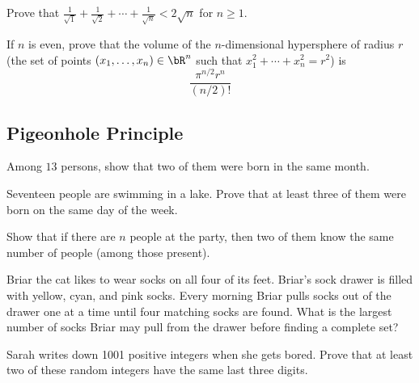 \documentclass[12pt]{article}
\begin{document}
        \begin{exercise}
            Prove that $\frac{1}{\sqrt{1}}+\frac{1}{\sqrt{2}}+\cdots+\frac{1}{\sqrt{n}}<2\sqrt{n}$ for $n\geq 1$.
        \end{exercise}

        \begin{exercise}
            If $n$ is even, prove that the volume of the $n$-dimensional hypersphere of radius $r$ (the set of points $(x_1,\dots,x_n)\in \bR^n$ such that $x_1^2+\cdots+x_n^2 = r^2$) is
            \[\frac{\pi^{n/2}r^n}{(n/2)!}\]
        \end{exercise}

        

    \subsection{Pigeonhole Principle}

        \begin{exercise}
            Among $13$ persons, show that two of them were born in the same month.
        \end{exercise}

        \begin{exercise}
            Seventeen people are swimming in a lake.
            Prove that at least three of them were born on the same day of the week.
        \end{exercise}
            
        \begin{exercise}
             Show that if there are $n$ people at the party, then two of them know the same number of people (among those present).
        \end{exercise}

        \begin{exercise}
            Briar the cat likes to wear socks on all four of its feet. 
            Briar's sock drawer is filled with yellow, cyan, and pink socks. 
            Every morning Briar pulls socks out of the drawer one at a time until four matching socks are found. 
            What is the largest number of socks Briar may pull from the drawer before finding a complete set?
        \end{exercise}

        \begin{exercise}
            Sarah writes down 1001 positive integers when she gets bored.
            Prove that at least two of these random integers have the same last three digits.
        \end{exercise}
            
\end{document}
